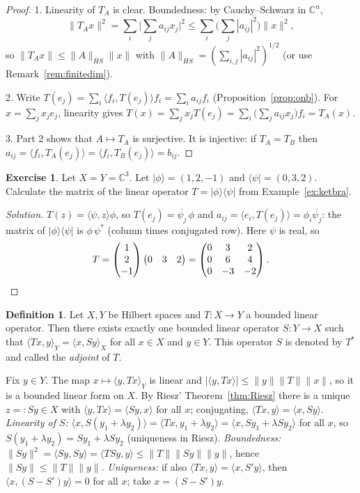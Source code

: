 \documentclass[11pt,a4paper]{article}
\numberwithin{equation}{section}
\newcommand{\C}{\mathbb{C}}
\newcommand{\ip}[2]{\langle #1, #2\rangle}
\newcommand{\ket}[1]{|#1\rangle}
\newcommand{\bra}[1]{\langle #1|}
\newcommand{\ketbra}[2]{|#1\rangle\langle #2|}
\newcommand{\conj}[1]{\overline{#1}}
\theoremstyle{plain}
\theoremstyle{definition}
\newtheorem{definition}[theorem]{Definition}
\newtheorem{exercise}[theorem]{Exercise}
\theoremstyle{plain}
\theoremstyle{definition}
\newenvironment{solution}{\begin{proof}[Solution]}{\end{proof}}
\begin{document}
\begin{proof}
1. Linearity of $T_A$ is clear. Boundedness: by Cauchy--Schwarz in $\C^n$,
\[
\|T_Ax\|^2=\sum_i\Big|\sum_ja_{ij}x_j\Big|^2\le\sum_i\Big(\sum_j|a_{ij}|^2\Big)\|x\|^2,
\]
so $\|T_Ax\|\le\|A\|_{HS}\|x\|$ with $\|A\|_{HS}=(\sum_{i,j}|a_{ij}|^2)^{1/2}$ (or use
Remark~\ref{rem:finitedim}).

2. Write $T(e_j)=\sum_i\ip{f_i}{T(e_j)}f_i=\sum_ia_{ij}f_i$ (Proposition~\ref{prop:onb}).
For $x=\sum_jx_je_j$, linearity gives
$T(x)=\sum_jx_jT(e_j)=\sum_i\big(\sum_ja_{ij}x_j\big)f_i=T_A(x)$.

3. Part 2 shows that $A\mapsto T_A$ is surjective. It is injective: if $T_A=T_B$ then
$a_{ij}=\ip{f_i}{T_A(e_j)}=\ip{f_i}{T_B(e_j)}=b_{ij}$.
\end{proof}

\begin{exercise}
Let $X=Y=\C^3$. Let $\ket{\phi}=(1,2,-1)$ and $\bra{\psi}=(0,3,2)$. Calculate the matrix of
the linear operator $T=\ketbra{\phi}{\psi}$ from Example~\ref{ex:ketbra}.
\end{exercise}
\begin{solution}
$T(z)=\ip{\psi}{z}\phi$, so $T(e_j)=\conj{\psi_j}\,\phi$ and
$a_{ij}=\ip{e_i}{T(e_j)}=\phi_i\conj{\psi_j}$: the matrix of $\ketbra{\phi}{\psi}$ is
$\phi\,\psi^*$ (column times conjugated row). Here $\psi$ is real, so
\[
T=\begin{pmatrix}1\\2\\-1\end{pmatrix}\begin{pmatrix}0&3&2\end{pmatrix}
=\begin{pmatrix}0&3&2\\0&6&4\\0&-3&-2\end{pmatrix}.\qedhere
\]
\end{solution}

\begin{definition}\label{def:adjoint}
Let $X,Y$ be Hilbert spaces and $T:X\to Y$ a bounded linear operator. Then there exists
exactly one bounded linear operator $S:Y\to X$ such that $\ip{Tx}{y}_Y=\ip{x}{Sy}_X$ for all
$x\in X$ and $y\in Y$. This operator $S$ is denoted by $T^*$ and called the \emph{adjoint} of $T$.
\end{definition}

\begin{addition}
Fix $y\in Y$. The map $x\mapsto\ip{y}{Tx}_Y$ is linear and $|\ip{y}{Tx}|\le\|y\|\|T\|\|x\|$,
so it is a bounded linear form on $X$. By Riesz' Theorem~\ref{thm:Riesz} there is a unique
$z=:Sy\in X$ with $\ip{y}{Tx}=\ip{Sy}{x}$ for all $x$; conjugating,
$\ip{Tx}{y}=\ip{x}{Sy}$. \emph{Linearity of $S$:}
$\ip{x}{S(y_1+\lambda y_2)}=\ip{Tx}{y_1+\lambda y_2}=\ip{x}{Sy_1+\lambda Sy_2}$ for all $x$,
so $S(y_1+\lambda y_2)=Sy_1+\lambda Sy_2$ (uniqueness in Riesz).
\emph{Boundedness:} $\|Sy\|^2=\ip{Sy}{Sy}=\ip{TSy}{y}\le\|T\|\|Sy\|\|y\|$, hence
$\|Sy\|\le\|T\|\|y\|$. \emph{Uniqueness:} if also $\ip{Tx}{y}=\ip{x}{S'y}$, then
$\ip{x}{(S-S')y}=0$ for all $x$; take $x=(S-S')y$.
\end{addition}
\end{document}
